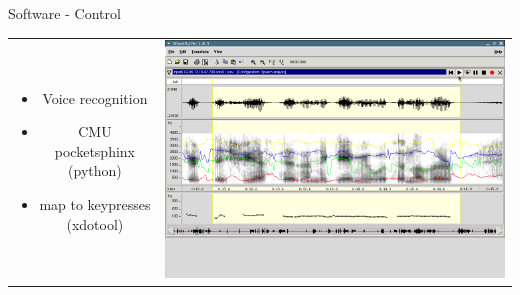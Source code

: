 \documentclass[xcolor=svgnames,handout,aspectratio=169]{beamer}
\begin{document}
\begin{frame}
	{Software - Control}

	\begin{tabular}{cl}  
			\parbox{0.35\linewidth}{
				\begin{itemize}
					\item Voice recognition
					\item CMU pocketsphinx (python)
					\item map to keypresses (xdotool)
				\end{itemize}
			}&
			\parbox{0.6\linewidth}{			
				\includegraphics[width=\linewidth]{images/waveform}
			}
		\end{tabular}
\end{frame}
\end{document}
